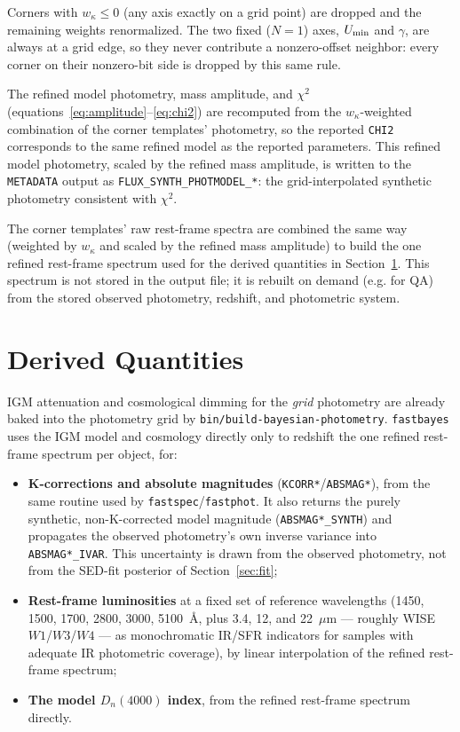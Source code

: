 \documentclass[12pt]{article}
\newcommand{\chisq}{\chi^2}
\begin{document}
Corners with $w_\kappa \le 0$ (any axis exactly on a grid point) are
dropped and the remaining weights renormalized. The two fixed ($N=1$)
axes, $U_{\rm min}$ and $\gamma$, are always at a grid edge, so they never
contribute a nonzero-offset neighbor: every corner on their nonzero-bit
side is dropped by this same rule.

The refined model photometry, mass amplitude, and $\chisq$
(equations~\ref{eq:amplitude}--\ref{eq:chi2}) are recomputed from the
$w_\kappa$-weighted combination of the corner templates' photometry, so
the reported \texttt{CHI2} corresponds to the same refined model as the
reported parameters. This refined model photometry, scaled by the refined
mass amplitude, is written to the \texttt{METADATA} output as
\texttt{FLUX\_SYNTH\_PHOTMODEL\_*}: the grid-interpolated synthetic
photometry consistent with $\chisq$.

The corner templates' raw rest-frame spectra are combined the same way
(weighted by $w_\kappa$ and scaled by the refined mass amplitude) to build
the one refined rest-frame spectrum used for the derived quantities in
Section~\ref{sec:derived}. This spectrum is not stored in the output
file; it is rebuilt on demand (e.g. for QA) from the stored observed
photometry, redshift, and photometric system.

\section{Derived Quantities}
\label{sec:derived}

IGM attenuation and cosmological dimming for the \emph{grid} photometry
are already baked into the photometry grid by
\texttt{bin/build-bayesian-photometry}. \texttt{fastbayes} uses the IGM
model and cosmology directly only to redshift the one refined rest-frame
spectrum per object, for:
\begin{itemize}
\item \textbf{K-corrections and absolute magnitudes}
  (\texttt{KCORR*}/\texttt{ABSMAG*}), from the same routine used by
  \texttt{fastspec}/\texttt{fastphot}. It also returns the purely
  synthetic, non-K-corrected model magnitude (\texttt{ABSMAG*\_SYNTH})
  and propagates the observed photometry's own inverse variance into
  \texttt{ABSMAG*\_IVAR}. This uncertainty is drawn from the observed
  photometry, not from the SED-fit posterior of Section~\ref{sec:fit};
\item \textbf{Rest-frame luminosities} at a fixed set of reference
  wavelengths (1450, 1500, 1700, 2800, 3000, 5100~\AA, plus 3.4, 12, and
  22~$\mu$m --- roughly WISE $W1$/$W3$/$W4$ --- as monochromatic
  IR/SFR indicators for samples with adequate IR photometric coverage), by
  linear interpolation of the refined rest-frame spectrum;
\item \textbf{The model $D_n(4000)$ index}, from the refined rest-frame
  spectrum directly.
\end{itemize}
\end{document}

